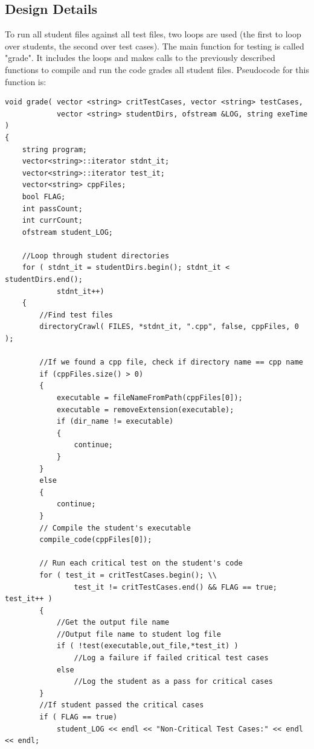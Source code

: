 \subsection{Design Details}
To run all student files against all test files, two loops are used (the first to loop over students, the second over test cases). The main function for testing is called "grade". It includes the loops and makes calls to the previously described functions to compile and run the code grades all student files. Pseudocode for this function is:
\begin{lstlisting}
void grade( vector <string> critTestCases, vector <string> testCases,
            vector <string> studentDirs, ofstream &LOG, string exeTime )
{
    string program;
    vector<string>::iterator stdnt_it;
    vector<string>::iterator test_it;
    vector<string> cppFiles;
    bool FLAG;
    int passCount;
    int currCount;
    ofstream student_LOG;

	//Loop through student directories
    for ( stdnt_it = studentDirs.begin(); stdnt_it < studentDirs.end(); 
    		stdnt_it++)
    {
        //Find test files
        directoryCrawl( FILES, *stdnt_it, ".cpp", false, cppFiles, 0 );

		//If we found a cpp file, check if directory name == cpp name
        if (cppFiles.size() > 0)
        {
            executable = fileNameFromPath(cppFiles[0]);
            executable = removeExtension(executable);
            if (dir_name != executable)
            {
                continue;
            }
        }
        else
        {
            continue;
        }
		// Compile the student's executable
        compile_code(cppFiles[0]);

        // Run each critical test on the student's code
        for ( test_it = critTestCases.begin(); \\
        		test_it != critTestCases.end() && FLAG == true; test_it++ )
        {
            //Get the output file name
            //Output file name to student log file
            if ( !test(executable,out_file,*test_it) )
                //Log a failure if failed critical test cases
            else
                //Log the student as a pass for critical cases
        }
		//If student passed the critical cases
        if ( FLAG == true)
            student_LOG << endl << "Non-Critical Test Cases:" << endl << endl;


\end{lstlisting}
